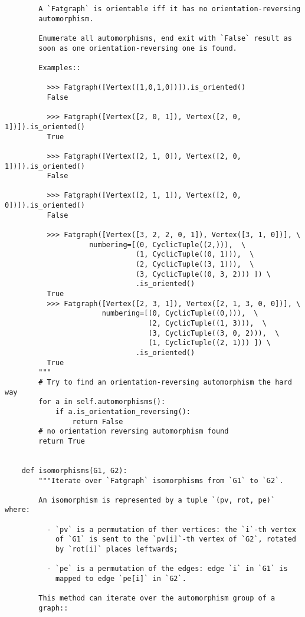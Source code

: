 \begin{lstlisting}
        A `Fatgraph` is orientable iff it has no orientation-reversing
        automorphism.

        Enumerate all automorphisms, end exit with `False` result as
        soon as one orientation-reversing one is found.

        Examples::

          >>> Fatgraph([Vertex([1,0,1,0])]).is_oriented()
          False

          >>> Fatgraph([Vertex([2, 0, 1]), Vertex([2, 0, 1])]).is_oriented()
          True
          
          >>> Fatgraph([Vertex([2, 1, 0]), Vertex([2, 0, 1])]).is_oriented()
          False
          
          >>> Fatgraph([Vertex([2, 1, 1]), Vertex([2, 0, 0])]).is_oriented()
          False

          >>> Fatgraph([Vertex([3, 2, 2, 0, 1]), Vertex([3, 1, 0])], \
                    numbering=[(0, CyclicTuple((2,))),  \
                               (1, CyclicTuple((0, 1))),  \
                               (2, CyclicTuple((3, 1))),  \
                               (3, CyclicTuple((0, 3, 2))) ]) \
                               .is_oriented()
          True
          >>> Fatgraph([Vertex([2, 3, 1]), Vertex([2, 1, 3, 0, 0])], \
                       numbering=[(0, CyclicTuple((0,))),  \
                                  (2, CyclicTuple((1, 3))),  \
                                  (3, CyclicTuple((3, 0, 2))),  \
                                  (1, CyclicTuple((2, 1))) ]) \
                               .is_oriented()
          True
        """
        # Try to find an orientation-reversing automorphism the hard way
        for a in self.automorphisms():
            if a.is_orientation_reversing():
                return False
        # no orientation reversing automorphism found
        return True


    def isomorphisms(G1, G2):
        """Iterate over `Fatgraph` isomorphisms from `G1` to `G2`.

        An isomorphism is represented by a tuple `(pv, rot, pe)` where:

          - `pv` is a permutation of ther vertices: the `i`-th vertex
            of `G1` is sent to the `pv[i]`-th vertex of `G2`, rotated
            by `rot[i]` places leftwards;

          - `pe` is a permutation of the edges: edge `i` in `G1` is
            mapped to edge `pe[i]` in `G2`.

        This method can iterate over the automorphism group of a
        graph::


\end{lstlisting}
